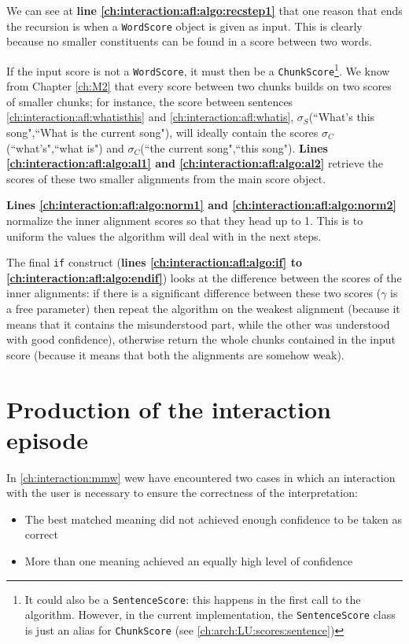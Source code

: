 We can see at \textbf{line \ref{ch:interaction:afl:algo:recstep1}} that one reason that ends the recursion is when a \texttt{WordScore} object is given as input. This is clearly because no smaller constituents can be found in a score between two words.

If the input score is not a \texttt{WordScore}, it must then be a \texttt{ChunkScore}\footnote{It could also be a \texttt{SentenceScore}: this happens in the first call to the algorithm. However, in the current implementation, the \texttt{SentenceScore} class is just an alias for \texttt{ChunkScore} (see \ref{ch:arch:LU:scores:sentence})}. We know from Chapter \ref{ch:M2} that every score between two chunks builds on two scores of smaller chunks; for instance, the score between sentences \ref{ch:interaction:afl:whatisthis} and \ref{ch:interaction:afl:whatis}, $\sigma_S$(``What's this song",``What is the current song"), will ideally contain the scores $\sigma_C$(``what's",``what is") and $\sigma_C$(``the current song",``this song"). \textbf{Lines \ref{ch:interaction:afl:algo:al1} and \ref{ch:interaction:afl:algo:al2}} retrieve the scores of these two smaller alignments from the main score object.

\textbf{Lines \ref{ch:interaction:afl:algo:norm1} and \ref{ch:interaction:afl:algo:norm2}} normalize the inner alignment scores so that they head up to 1. This is to uniform the values the algorithm will deal with in the next steps.

The final \texttt{if} construct (\textbf{lines \ref{ch:interaction:afl:algo:if} to \ref{ch:interaction:afl:algo:endif}}) looks at the difference between the scores of the inner alignments: if there is a significant difference between these two scores ($\gamma$ is a free parameter) then repeat the algorithm on the weakest alignment (because it means that it contains the misunderstood part, while the other was understood with good confidence), otherwise return the whole chunks contained in the input score (because it means that both the alignments are somehow weak).


\section{Production of the interaction episode} \label{ch:interaction:episode}
In \ref{ch:interaction:mmw} wew have encountered two cases in which an interaction with the user is necessary to ensure the correctness of the interpretation:
\begin{itemize}
	\item The best matched meaning did not achieved enough confidence to be taken as correct
	\item More than one meaning achieved an equally high level of confidence
\end{itemize}

